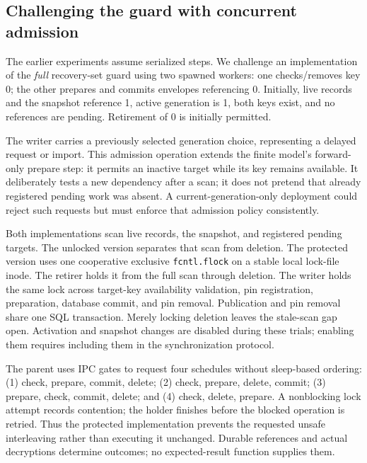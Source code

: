 \documentclass[10pt,conference]{IEEEtran}
\begin{document}
\subsection{Challenging the guard with concurrent admission}
The earlier experiments assume serialized steps. We challenge an implementation of the \emph{full} recovery-set guard using two spawned workers: one checks/removes key 0; the other prepares and commits envelopes referencing 0. Initially, live records and the snapshot reference 1, active generation is 1, both keys exist, and no references are pending. Retirement of 0 is initially permitted.

The writer carries a previously selected generation choice, representing a delayed request or import. This admission operation extends the finite model's forward-only prepare step: it permits an inactive target while its key remains available. It deliberately tests a new dependency after a scan; it does not pretend that already registered pending work was absent. A current-generation-only deployment could reject such requests but must enforce that admission policy consistently.

Both implementations scan live records, the snapshot, and registered pending targets. The unlocked version separates that scan from deletion. The protected version uses one cooperative exclusive \texttt{fcntl.flock} on a stable local lock-file inode. The retirer holds it from the full scan through deletion. The writer holds the same lock across target-key availability validation, pin registration, preparation, database commit, and pin removal. Publication and pin removal share one SQL transaction. Merely locking deletion leaves the stale-scan gap open. Activation and snapshot changes are disabled during these trials; enabling them requires including them in the synchronization protocol.

The parent uses IPC gates to request four schedules without sleep-based ordering: (1) check, prepare, commit, delete; (2) check, prepare, delete, commit; (3) prepare, check, commit, delete; and (4) check, delete, prepare. A nonblocking lock attempt records contention; the holder finishes before the blocked operation is retried. Thus the protected implementation prevents the requested unsafe interleaving rather than executing it unchanged. Durable references and actual decryptions determine outcomes; no expected-result function supplies them.
\end{document}

